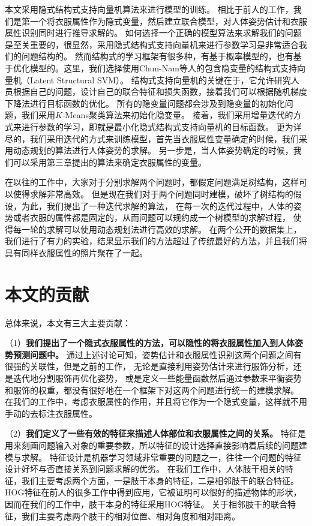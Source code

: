 本文采用隐式结构式支持向量机算法来进行模型的训练。
相比于前人的工作，我们是第一个将衣服属性作为隐式变量，然后建立联合模型，对人体姿势估计和衣服属性识别同时进行推导求解的。 如何选择一个正确的模型算法来求解我们的问题是至关重要的，很显然，采用隐式结构式支持向量机来进行参数学习是非常适合我们的问题结构的。 然而结构式的学习框架有很多种，有基于概率模型的，也有基于优化模型的。这里，我们选择使用Chun-Nam等人的包含隐变量的结构式支持向量机（Latent Structural SVM）。 结构式支持向量机的关键在于，它允许研究人员根据自己的问题，设计自己的联合特征和损失函数，接着我们可以根据随机梯度下降法进行目标函数的优化。
所有的隐变量问题都会涉及到隐变量的初始化问题，我们采用$K$-Means聚类算法来初始化隐变量。
接着，我们采用增量迭代的方式来进行参数的学习，即就是最小化隐式结构式支持向量机的目标函数。
更为详尽的，我们采用迭代的方式来训练模型，首先当衣服属性变量确定的时候，我们采用动态规划的算法进行人体姿势的求解。
另一步是，当人体姿势确定的时候，我们可以采用第三章提出的算法来确定衣服属性的变量。

在以往的工作中，大家对于分别求解两个问题时，都假定问题满足树结构，这样可以使得求解非常高效。 但是现在我们对于两个问题同时建模，破坏了树结构的假设，为此，我们提出了一种迭代求解的算法， 在每一次的迭代过程中，人体的姿势或者衣服的属性都是固定的，从而问题可以规约成一个树模型的求解过程， 使得每一轮的求解可以使用动态规划法进行高效的求解。
在两个公开的数据集上，我们进行了有力的实验，结果显示我们的方法超过了传统最好的方法，并且我们将具有同样衣服属性的照片聚在了一起。

\section{本文的贡献}
总体来说，本文有三大主要贡献：

（1）\textbf{我们提出了一个隐式衣服属性的方法，可以隐性的将衣服属性加入到人体姿势预测问题中。}
通过上述讨论可知，姿势估计和衣服属性识别这两个问题之间有很强的关联性，但是之前的工作，
无论是直接利用姿势估计来进行服饰分析，还是迭代地分割服饰再优化姿势，
或是定义一些能量函数然后通过参数来平衡姿势和服饰的权重，都没有很好地在一个框架下对这两个问题进行统一的建模求解。
在我们的工作中，考虑衣服属性的作用，并且将它作为一个隐式变量，这样就不用手动的去标注衣服属性。

（2）\textbf{我们定义了一些有效的特征来描述人体部位和衣服属性之间的关系。}
特征是用来刻画问题输入对象的重要参数，所以特征的设计选择直接影响着后续的问题建模与求解。 特征设计是机器学习领域非常重要的问题之一，往往一个问题的特征设计好坏与否直接关系到问题求解的优劣。
在我们工作中，人体肢干相关的特征，我们主要考虑两个方面，一是肢干本身的特征，二是相邻肢干的联合特征。 HOG特征在前人的很多工作中得到应用，它被证明可以很好的描述物体的形状，因而在我们的工作中，肢干本身的特征采用HOG特征。 关于相邻肢干的联合特征，我们主要考虑两个肢干的相对位置、相对角度和相对距离。


